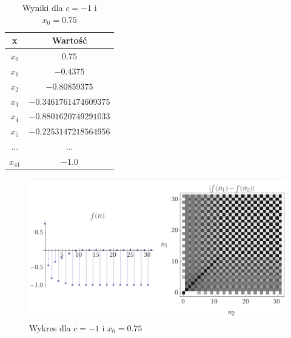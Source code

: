 \documentclass[a4paper,14pt]{report}
\begin{document}
    \begin{table}[H]
    \centering
    \begin{tabular}{|c | c |} 
     \hline
     x & Wartość \\ [0.5ex]
     \hline\hline
     $x_{0}$ & $0.75$ \\
     $x_{1}$ & $-0.4375$ \\
     $x_{2}$ & $-0.80859375$ \\
     $x_{3}$ & $-0.3461761474609375$ \\
     $x_{4}$ & $-0.8801620749291033$  \\
     $x_{5}$ & $-0.2253147218564956$ \\
     ... & ... \\
     $x_{41}$ & $-1.0 $ \\
     \hline
    \end{tabular}
    \caption{Wyniki dla $c=-1$ i $x_{0}=0.75$}
    \label{Zad6f}
    \end{table}
    \begin{figure}[H]
      \includegraphics[scale=1.0]{wykresZad6f}
      \centering
      \caption{Wykres dla $c=-1$ i $x_{0}=0.75$}
    \end{figure}
\end{document}
